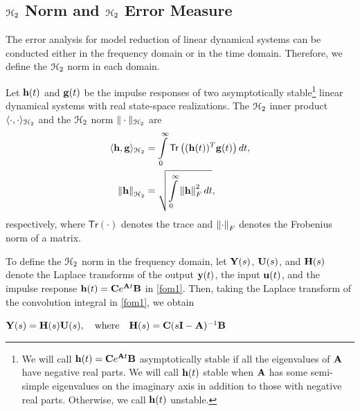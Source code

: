 \documentclass[twocolumn]{autart}
\begin{document}
\subsection{$\EuScript{H}_2$ Norm and $\EuScript{H}_2$ Error Measure}
The error analysis for model reduction of linear dynamical systems can be conducted either in the frequency domain or in the time domain. Therefore, we define the $\EuScript{H}_2$ norm in each domain. 
\begin{Definition}
Let $\mathbf{h}(t)$ and $\mathbf{g}(t)$ be the impulse responses of two asymptotically stable\footnote{We will call
$\mathbf{h}(t) = \mathbf{C} e^{\mathbf{A} t} \mathbf{B}$ asymptotically stable if all the eigenvalues of $\mathbf{A}$ have negative real parts. We will call 
$\mathbf{h}(t)$ stable when $\mathbf{A}$ has some semi-simple eigenvalues on the imaginary axis in addition to those with negative real parts. Otherwise, we call  $\mathbf{h}(t)$ unstable.}
linear dynamical systems with real state-space realizations.
The $\EuScript{H}_2$ inner product $\langle \cdot, \cdot \rangle_{\EuScript{H}_2}$ and the $\EuScript{H}_2$ norm $\| \cdot \|_{\EuScript{H}_2}$  are 
\begin{align*}
\langle \h, \g \rangle_{\ch_2} &=\int_0^\infty \mathsf{Tr}\left((\h(t))^T \g(t)\right) dt,\\
\norm{\h}_{\ch_2}&= \sqrt{ \int_0^\infty \norm{\h}_F^2 dt },
\end{align*} 
respectively, where $ \mathsf{Tr}(\cdot)$ denotes the trace and $\left\lVert\cdot\right\rVert_F$ denotes the Frobenius norm of a matrix.
\end{Definition}
To define the $\EuScript{H}_2$ norm in the frequency domain, let $\mathbf{Y}(s)$, $\mathbf{U}(s)$, and $\mathbf{H}(s)$ denote the Laplace transforms of 
 the output $\mathbf{y}(t)$, the input $\mathbf{u}(t)$, and the impulse response $\mathbf{h}(t) = \mathbf{C} e^{\mathbf{A} t}\mathbf{B}$
in \eqref{fom1}. Then, taking the Laplace transform of the convolution integral in  \eqref{fom1}, we obtain


$\mathbf{Y}(s)= \mathbf{H}(s) \mathbf{U}(s),  \quad \mbox{where} \quad \mathbf{H}(s) =\mathbf{C}(s\mathbf{I}-\mathbf{A})^{-1}\mathbf{B}$
\end{document}
